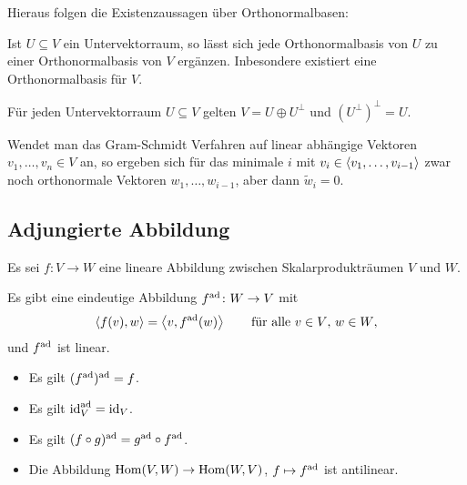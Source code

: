 Hieraus folgen die Existenzaussagen über Orthonormalbasen:

\begin{theorem}
  Ist $U \subseteq V$ ein Untervektorraum, so lässt sich jede Orthonormalbasis von $U$ zu einer Orthonormalbasis von $V$ ergänzen.
  Inbesondere existiert eine Orthonormalbasis für $V$.
\end{theorem}

\begin{corollary}
  Für jeden Untervektorraum $U \subseteq V$ gelten $V = U \oplus U^\perp$ und $(U^\perp)^\perp = U$.
\end{corollary}

\begin{remark}
  Wendet man das Gram-Schmidt Verfahren auf linear abhängige Vektoren $v_1, \dotsc, v_n \in V$ an, so ergeben sich für das minimale $i$ mit $v_i \in \left\langle v_1, \dotsc, v_{i-1} \right\rangle$ zwar noch orthonormale Vektoren $w_1, \dotsc, w_{i-1}$, aber dann $\tilde{w}_i = 0$.
\end{remark}






\subsection{Adjungierte Abbildung}
\label{subsection: adjoint map for scalar products}

Es sei $f \colon V \to W$ eine lineare Abbildung zwischen Skalarprodukträumen $V$ und $W$.

\begin{proposition}
  Es gibt eine eindeutige Abbildung $f^{\operatorname{ad}} \colon W \to V$ mit
  \begin{equation}
    \label{equation: definition of the adjoint map by elements for scalar products}
      \left\langle f(v), w \right\rangle
    = \left\langle v, f^{\operatorname{ad}}(w) \right\rangle
    \qquad
    \text{für alle $v \in V$, $w \in W$},
  \end{equation}
  und $f^{\operatorname{ad}}$ ist linear.
\end{proposition}

\begin{lemma}
  \begin{itemize}
    \item
      Es gilt $(f^{\operatorname{ad}})^{\operatorname{ad}} = f$.
    \item
      Es gilt $\operatorname{id}_V^{\operatorname{ad}} = \operatorname{id}_V$.
    \item
      Es gilt $(f \circ g)^{\operatorname{ad}} = g^{\operatorname{ad}} \circ f^{\operatorname{ad}}$.
    \item
      Die Abbildung $\operatorname{Hom}(V, W) \to \operatorname{Hom}(W, V)$, $f \mapsto f^{\operatorname{ad}}$ ist antilinear.
  \end{itemize}
\end{lemma}

